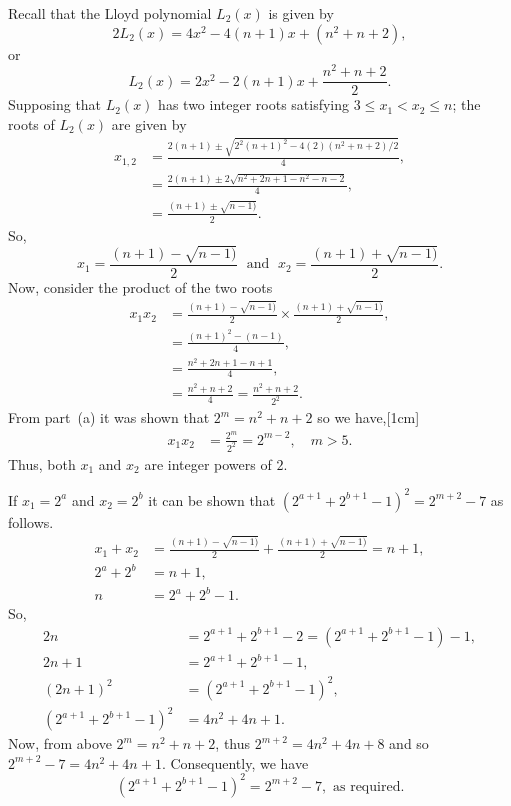 Recall that the Lloyd polynomial $L_2(x)$ is given by
\[
	2L_2(x) = 4x^2 - 4(n+1)x + (n^2 + n +2),
\]
or 
\[
	L_2(x) = 2x^2 - 2(n+1)x + \frac{n^2 + n +2}{2}.
\]
Supposing that $L_2(x)$ has two integer roots satisfying $3\leq x_1 < x_2 \leq n$; the roots of $L_2(x)$ are given by
\begin{align*}
	x_{1,2} &= \frac{2(n+1)\pm\sqrt{2^2(n+1)^2-4(2)(n^2+n+2)/2}}{4},\\
	&= \frac{2(n+1)\pm2\sqrt{n^2+2n+1-n^2-n-2}}{4},\\
	&= \frac{(n+1)\pm\sqrt{n-1)}}{2}.
\end{align*}
So, 
\[
	x_1 = \frac{(n+1)-\sqrt{n-1)}}{2}\;\text{  and  }\; x_2 = \frac{(n+1)+\sqrt{n-1)}}{2}.
\]
Now, consider the product of the two roots
\begin{align*}
x_1x_2 &= \frac{(n+1)-\sqrt{n-1)}}{2}\times \frac{(n+1)+\sqrt{n-1)}}{2},\\
&= \frac{(n+1)^2 - (n-1)}{4},\\
&= \frac{n^2 + 2n + 1 - n+1}{4},\\
&= \frac{n^2 + n + 2}{4}=\frac{n^2 + n + 2}{2^2}.
\end{align*}
From part~(a) it was shown that $2^m=n^2 + n + 2$ so we have,[1cm]
\begin{align*}
	x_1x_2 &= \frac{2^m}{2^2} = 2^{m-2},\quad m>5.
\end{align*}
Thus, both $x_1$ and $x_2$ are integer powers of $2$.

If $x_1=2^a$ and $x_2=2^b$ it can be shown that $(2^{a+1} + 2^{b+1} - 1)^2 = 2^{m+2}-7$ as follows.
\begin{align*}
	x_1 + x_2 &= \frac{(n+1)-\sqrt{n-1)}}{2} + \frac{(n+1)+\sqrt{n-1)}}{2} = n+1,\\
	2^a + 2^b &= n + 1,\\
	n &= 2^a + 2^b - 1.
\end{align*}
So, 
\begin{align*}
	 2n &= 2^{a+1} + 2^{b+1} - 2 = (2^{a+1} + 2^{b+1} - 1) - 1,\\
	 2n + 1 &= 2^{a+1} + 2^{b+1} - 1,\\
	 (2n + 1)^2 &= (2^{a+1} + 2^{b+1} - 1)^2,\\
	 (2^{a+1} + 2^{b+1} - 1)^2 &= 4n^2 + 4n +1.
\end{align*}
Now, from above $2^m=n^2+n+2$, thus $2^{m+2}=4n^2+4n+8$ and so $2^{m+2} - 7=4n^2+4n+1$. Consequently, we have
\[
	(2^{a+1} + 2^{b+1} - 1)^2 = 2^{m+2} - 7, \text{ as required.}
\]

